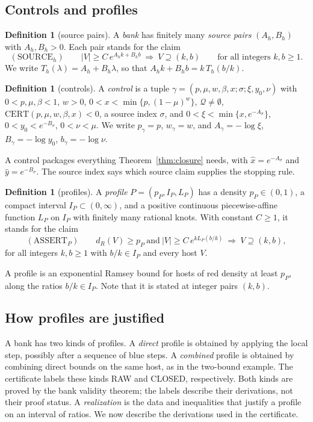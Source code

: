 \documentclass[11pt]{article}
\theoremstyle{definition}
\newtheorem{definition}[theorem]{Definition}
\theoremstyle{remark}
\newcommand{\cert}{\mathrm{CERT}}
\newcommand{\feas}{\mathcal Q}
\begin{document}
\subsection{Controls and profiles}

\begin{definition}[source pairs]
A \emph{bank} has finitely many \emph{source pairs} $(A_h,B_h)$ with $A_h,B_h>0$. Each pair stands for the claim
\[
(\mathrm{SOURCE}_h)\qquad |V|\ge C\,e^{A_hk+B_hb}\ \Longrightarrow\ V\supseteq(k,b)\qquad\text{for all integers }k,b\ge1.
\]
We write $T_h(\lambda)=A_h+B_h\lambda$, so that $A_hk+B_hb=k\,T_h(b/k)$.
\end{definition}

\begin{definition}[controls]
A \emph{control} is a tuple $\gamma=(p,\mu,w,\beta,x;\sigma;\xi,y_0,\nu)$ with $0<p,\mu,\beta<1$, $w>0$,
$0<x<\min\{p,(1-\mu)^w\}$, $\feas\ne\emptyset$, $\cert(p,\mu,w,\beta,x)<0$, a source index $\sigma$, and
$0<\xi<\min\{x,e^{-A_\sigma}\}$, $0<y_0<e^{-B_\sigma}$, $0<\nu<\mu$. We write $p_\gamma=p$, $w_\gamma=w$, and
$A_\gamma=-\log\xi$, $B_\gamma=-\log y_0$, $b_\gamma=-\log\nu$.
\end{definition}

A control packages everything Theorem~\ref{thm:closure} needs, with $\hat x=e^{-A_\sigma}$ and $\hat y=e^{-B_\sigma}$.
The source index says which source claim supplies the stopping rule.

\begin{definition}[profiles]
A \emph{profile} $P=(p_P,I_P,L_P)$ has a density $p_P\in(0,1)$, a compact interval $I_P\subset(0,\infty)$, and a
positive continuous piecewise-affine function $L_P$ on $I_P$ with finitely many rational knots. With constant $C\ge1$,
it stands for the claim
\[
(\mathrm{ASSERT}_P)\qquad d_R(V)\ge p_P\ \text{and}\ |V|\ge C\,e^{kL_P(b/k)}\ \Longrightarrow\ V\supseteq(k,b),
\]
for all integers $k,b\ge1$ with $b/k\in I_P$ and every host $V$.
\end{definition}

A profile is an exponential Ramsey bound for hosts of red density at least $p_P$, along the ratios $b/k\in I_P$. Note
that it is stated at integer pairs $(k,b)$.

\subsection{How profiles are justified}

A bank has two kinds of profiles. A \emph{direct} profile is obtained by applying the local step, possibly
after a sequence of blue steps. A \emph{combined} profile is obtained by combining direct bounds on the same
host, as in the two-bound example. The certificate labels these kinds RAW and CLOSED, respectively.
Both kinds are proved by the bank validity theorem; the labels describe their derivations, not their proof status.
A \emph{realization} is the data and inequalities that justify a profile on an interval of ratios.
We now describe the derivations used in the certificate.
\end{document}
